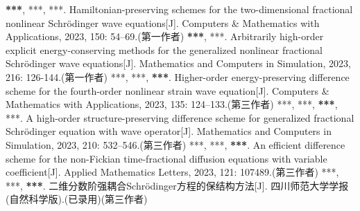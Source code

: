    \begin{mypaper}
      \begin{thebibliography}{99}  
       \textbf{***}, ***, ***. Hamiltonian-preserving schemes for the two-dimensional fractional nonlinear Schrödinger wave equations[J]. Computers \& Mathematics with Applications, 2023, 150: 54–69.(第一作者)
       \textbf{***}, ***. Arbitrarily high-order explicit energy-conserving methods for the generalized nonlinear fractional Schrödinger wave equations[J]. Mathematics and Computers in Simulation, 2023, 216: 126-144.(第一作者)
       ***, ***, \textbf{***}. Higher-order energy-preserving difference scheme for the fourth-order nonlinear strain wave equation[J]. Computers \& Mathematics with Applications, 2023, 135: 124–133.(第三作者)
       ***, ***, \textbf{***}, ***. A high-order structure-preserving difference scheme for generalized fractional Schrödinger equation with wave operator[J]. Mathematics and Computers in Simulation, 2023, 210: 532–546.(第三作者)
       ***, ***, \textbf{***}. An efficient difference scheme for the non-Fickian time-fractional diffusion equations with variable coefficient[J]. Applied Mathematics Letters, 2023, 121: 107489.(第三作者)
       ***, ***, \textbf{***}. 二维分数阶强耦合Schr{\"o}dinger方程的保结构方法[J]. 四川师范大学学报(自然科学版).(已录用)(第三作者)
      \end{thebibliography}
   \end{mypaper}
   